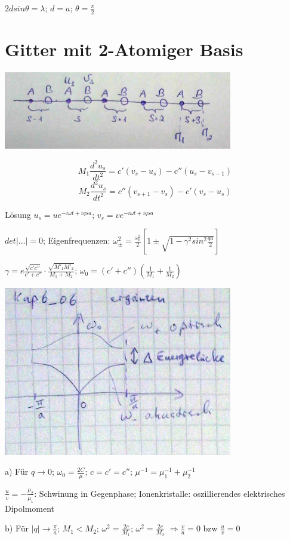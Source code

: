\(2dsin\theta=\lambda\); \(d=a\); \(\theta = \frac{\pi}{2}\)

\section{Gitter mit 2-Atomiger Basis}

\includegraphics[width=0.75\textwidth]{kap06_05.png}

\[ M_1\frac{d^2 u_s}{dt^2} = c'(v_s-u_s)-c''(u_s-v_{s-1})\]
\[ M_2\frac{d^2 u_s}{dt^2} = c''(v_{s+1}-v_s)-c'(v_s-u_s)\]

Lösung \(u_s=ue^{-i\omega t + iqsa}\); \(v_s=ve^{-i\omega t + iqsa}\)



\(det|...|=0\); Eigenfrequenzen: \(\omega^2_{\pm} = \frac{\omega^2_0}{2}\left[1\pm \sqrt{1-\gamma^2 sin^2\frac{qa}{2}} \right]\)


\(\gamma = e \frac{\sqrt{c'c''}}{c'+c''}\cdot \frac{\sqrt{M'_1 M'_2}}{M_1+M_2}\); \(\omega_0 = (c'+c'')(\frac{1}{M_1}+\frac{1}{M_2})\)

\includegraphics[width=0.75\textwidth]{kap06_06.png}


a) Für \(q\rightarrow 0\); \(\omega_0=\frac{2C}{\mu}\); \(c=c'=c''\); \(\mu^{-1}=\mu^{-1}_1+\mu^{-1}_2\)

\(\frac{u}{v}= -\frac{\mu_2}{\mu_1}\): Schwinung in Gegenphase; Ionenkristalle: oszillierendes elektrisches Dipolmoment

b) Für \(|q|\rightarrow \frac{\pi}{a}\); \(M_1<M_2\); \(\omega^2=\frac{2c}{M_1}\); \(\omega^2=\frac{2c}{M_2}\) \(\Rightarrow \frac{v}{u}=0\) bzw \(\frac{u}{v}=0\)

